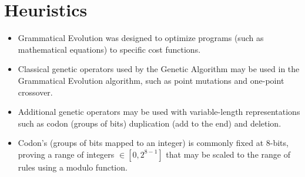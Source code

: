 \documentclass[a4paper, 11pt]{article}
\begin{document}
\section{Heuristics}
\label{sec:heuristics}
\begin{itemize}
	\item Grammatical Evolution was designed to optimize programs (such as mathematical equations) to specific cost functions.
	\item Classical genetic operators used by the Genetic Algorithm may be used in the Grammatical Evolution algorithm, such as point mutations and one-point crossover.
	\item Additional genetic operators may be used with variable-length representations such as codon (groups of bits) duplication (add to the end) and deletion.
	\item Codon's (groups of bits mapped to an integer) is commonly fixed at 8-bits, proving a range of integers $\in [0,2^{8-1}]$ that may be scaled to the range of rules using a modulo function.
\end{itemize}

\end{document}
